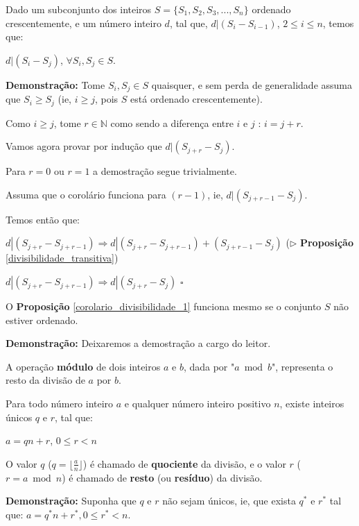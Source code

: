 \begin{proposition}\label{corolario_divisibilidade_1}
Dado um subconjunto dos inteiros $S = \{S_1, S_2, S_3, ..., S_n\}$ ordenado crescentemente, e um número inteiro $d$, tal que, $d|(S_i-S_{i-1})$, $2 \leq i \leq n$, 
temos que: 

$d|(S_i-S_j)$, $\forall S_i, S_j \in S$.

\end{proposition}
\textbf{Demonstração:}
Tome $S_i,S_j \in S$ quaisquer, e sem perda de generalidade assuma que $S_i \geq S_j$ (ie, $i \geq j$, pois $S$ está ordenado crescentemente).

Como $i \geq j$, tome $r \in \mathbb{N}$ como sendo a diferença entre $i$ e $j$ : $i = j + r$.

Vamos agora provar por indução que $d|(S_{j+r}-S_j)$.

Para $r=0$ ou $r=1$ a demostração segue trivialmente.

Assuma que o corolário funciona para $(r-1)$, ie, $d|(S_{j+r-1}-S_j)$. 

Temos então que: 

$d|(S_{j+r}-S_{j+r-1}) \Rightarrow d|(S_{j+r}-S_{j+r-1})+(S_{j+r-1}-S_j)$ ($\triangleright$ \textbf{Proposição} \autoref{divisibilidade_transitiva})

$d|(S_{j+r}-S_{j+r-1}) \Rightarrow d|(S_{j+r}-S_j)$ $\square$ 


\begin{proposition}\label{corolario_divisibilidade_1.1}
O \textbf{Proposição} \autoref{corolario_divisibilidade_1} funciona mesmo se o conjunto $S$ não estiver ordenado.
\end{proposition}
\textbf{Demonstração:}
Deixaremos a demostração a cargo do leitor.
\newline

\begin{definition}
A operação \textbf{módulo} de dois inteiros $a$ e $b$, dada por "$a \bmod b$", representa o resto da divisão de $a$ por $b$.
\end{definition}

\begin{theorem}\label{algoritmo_divisao}
Para todo número inteiro $a$ e qualquer número inteiro positivo $n$, existe inteiros únicos $q$ e $r$, tal que:

$a = qn + r$, $0 \leq r < n$

O valor $q$ ($q = \lfloor  \frac{a}{n} \rfloor$) é chamado de \textbf{quociente} da divisão, e o valor $r$ ($r = a \bmod n$) é chamado de \textbf{resto}
(ou \textbf{resíduo}) da divisão.
\end{theorem}
\textbf{Demonstração:}
Suponha que $q$ e $r$ não sejam únicos, ie, que exista $q^*$ e $r^*$ tal que: $a = q^*n + r^*, 0 \leq r^* < n$.

